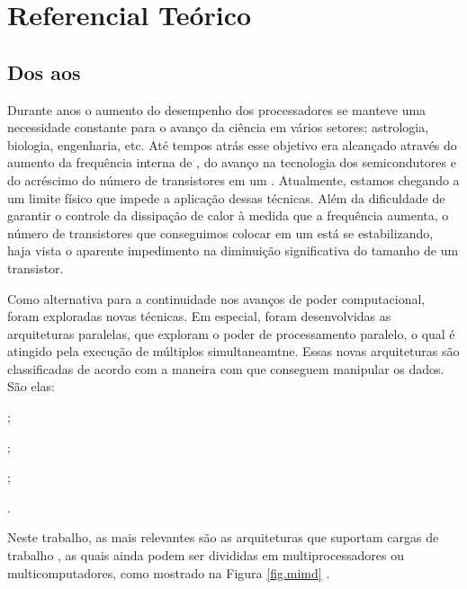 \glsresetall
\chapter{Referencial Teórico}
\label{chap.background}

\section{Dos \singlecores aos \Lws}
\label{sec.lw}

Durante anos o aumento do desempenho dos processadores se manteve uma necessidade constante para o avanço da ciência em vários setores: astrologia, biologia, engenharia, etc. Até tempos atrás esse objetivo era alcançado através do aumento da frequência interna de \singlecores, do avanço na tecnologia dos semicondutores e do acréscimo do número de transistores em um \chip. Atualmente, estamos chegando a um limite físico que impede a aplicação dessas técnicas. Além da dificuldade de garantir o controle da dissipação de calor à medida que a frequência aumenta, o número de transistores que conseguimos colocar em um \chip está se estabilizando, haja vista o aparente impedimento na diminuição significativa do tamanho de um transistor.

Como alternativa para a continuidade nos avanços de poder computacional, foram exploradas novas técnicas. Em especial, foram desenvolvidas as arquiteturas paralelas, que exploram o poder de processamento paralelo, o qual é atingido pela execução de múltiplos \cores simultaneamtne. Essas novas arquiteturas são classificadas de acordo com a maneira com que conseguem manipular os dados. São elas:
\begin{inlinelist}
    \item \sisd;
    \item \simd;
    \item \misd;
    \item \mimd.
\end{inlinelist}
Neste trabalho, as mais relevantes são as arquiteturas que suportam cargas de trabalho \mimd, as quais ainda podem ser divididas em multiprocessadores ou multicomputadores, como mostrado na Figura \ref{fig.mimd} \cite{tanenbaum:4ed}. 

